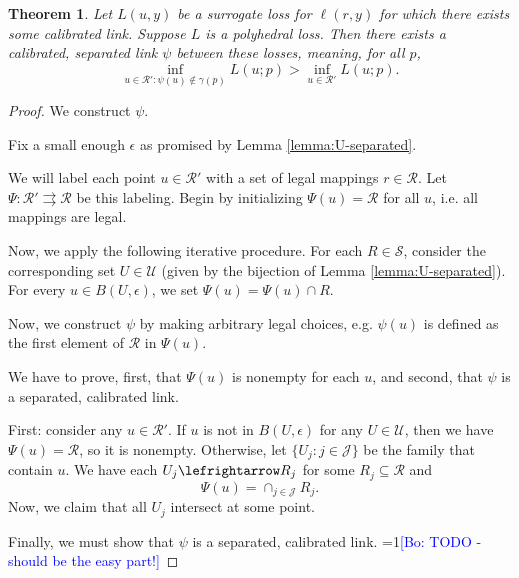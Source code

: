 \documentclass{article}
\newcommand{\Comments}{1}
\newcommand{\mynote}[2]{\ifnum\Comments=1\textcolor{#1}{#2}\fi}
\newcommand{\bo}[1]{\mynote{blue}{[Bo: #1]}}
\newcommand{\R}{\mathcal{R}}
\newcommand{\toto}{\rightrightarrows}
\newtheorem{theorem}{Theorem}
\begin{document}
\begin{theorem}
  Let $L(u,y)$ be a surrogate loss for $\ell(r,y)$ for which there exists some calibrated link.
  Suppose $L$ is a polyhedral loss.
  Then there exists a calibrated, \emph{separated} link $\psi$ between these losses, meaning, for all $p$,
    \[ \inf_{u \in \R' : \psi(u) \not\in \gamma(p)} L(u;p) > \inf_{u \in \R'} L(u;p) . \]
\end{theorem}
\begin{proof}
We construct $\psi$.

Fix a small enough $\epsilon$ as promised by Lemma \ref{lemma:U-separated}.

We will label each point $u \in \R'$ with a set of legal mappings $r \in \R$.
Let $\Psi: \R' \toto \R$ be this labeling.
Begin by initializing $\Psi(u) = \R$ for all $u$, i.e. all mappings are legal.

Now, we apply the following iterative procedure.
For each $R \in \mathcal{S}$, consider the corresponding set $U \in \mathcal{U}$ (given by the bijection of Lemma \ref{lemma:U-separated}).
For every $u \in B\left(U, \epsilon\right)$, we set $\Psi(u) = \Psi(u) \cap R$.


Now, we construct $\psi$ by making arbitrary legal choices, e.g. $\psi(u)$ is defined as the first element of $\R$ in $\Psi(u)$.

We have to prove, first, that $\Psi(u)$ is nonempty for each $u$, and second, that $\psi$ is a separated, calibrated link.

First: consider any $u \in \R'$.
If $u$ is not in $B(U,\epsilon)$ for any $U \in \mathcal{U}$, then we have $\Psi(u) = \R$, so it is nonempty.
Otherwise, let $\{U_j : j \in \mathcal{J}\}$ be the family that contain $u$.
We have each $U_j \lefrightarrow R_j$ for some $R_j \subseteq \R$ and
  \[ \Psi(u) = \cap_{j \in \mathcal{J}} R_j . \]
Now, we claim that all $U_j$ intersect at some point.

Finally, we must show that $\psi$ is a separated, calibrated link.
\bo{TODO - should be the easy part!}
\end{proof}
\end{document}
